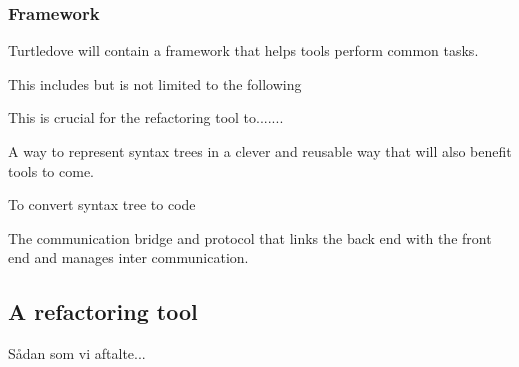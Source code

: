 \documentclass[a4paper,oneside]{article}
\begin{document}
\subsubsection{Framework}
Turtledove will contain a framework that helps tools perform common tasks.

This includes but is not limited to the following

\begin{description}
\item[Parsing] This is crucial for the refactoring tool to.......

\item[Syntax tree representation] A way to represent syntax trees in a clever and reusable way
  that will also benefit tools to come.

\item[Pretty printing] To convert syntax tree to code

\item[Serializing] The communication bridge and protocol that links the back
  end with the front end and manages inter communication.
\end{description}

%
%

\subsection{A refactoring tool}
\label{primary_goals:a_refactoring_tool}
Sådan som vi aftalte...
\end{document}
